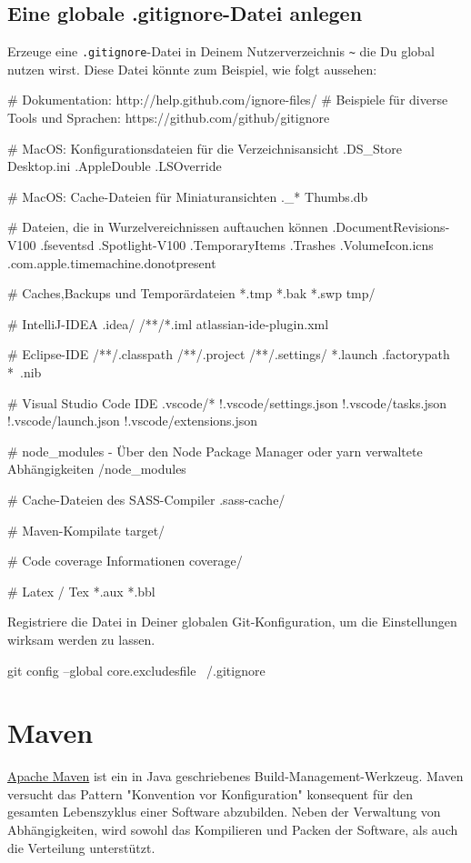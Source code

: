 \documentclass[]{article}
\newcommand{\code}[1]{\texttt{#1}}
\begin{document}
\subsection{Eine globale .gitignore-Datei anlegen}
Erzeuge eine \code{.gitignore}-Datei in Deinem Nutzerverzeichnis \code{\~} die Du global nutzen wirst. Diese Datei könnte zum Beispiel, wie folgt aussehen:
\begin{bashcode}
# Dokumentation: http://help.github.com/ignore-files/
# Beispiele für diverse Tools und Sprachen: https://github.com/github/gitignore

# MacOS: Konfigurationsdateien für die Verzeichnisansicht
.DS_Store
Desktop.ini
.AppleDouble
.LSOverride

# MacOS: Cache-Dateien für Miniaturansichten
._*
Thumbs.db

# Dateien, die in Wurzelvereichnissen auftauchen können
.DocumentRevisions-V100
.fseventsd
.Spotlight-V100
.TemporaryItems
.Trashes
.VolumeIcon.icns
.com.apple.timemachine.donotpresent

# Caches,Backups und Temporärdateien
*.tmp
*.bak
*.swp
tmp/

# IntelliJ-IDEA
.idea/
/**/*.iml
atlassian-ide-plugin.xml

# Eclipse-IDE
/**/.classpath
/**/.project
/**/.settings/
*.launch
.factorypath
*~.nib

 # Visual Studio Code IDE
.vscode/*
!.vscode/settings.json
!.vscode/tasks.json
!.vscode/launch.json
!.vscode/extensions.json

# node_modules - Über den Node Package Manager oder yarn verwaltete Abhängigkeiten
/node_modules

# Cache-Dateien des SASS-Compiler
.sass-cache/

# Maven-Kompilate
target/

# Code coverage Informationen
coverage/

 # Latex / Tex
*.aux
*.bbl

\end{bashcode}

Registriere die Datei in Deiner globalen Git-Konfiguration, um die Einstellungen wirksam werden zu lassen.
\begin{bashcode}
git config --global core.excludesfile ~/.gitignore
\end{bashcode}

\section{Maven}
\href{https://maven.apache.org/}{Apache Maven} ist ein in Java geschriebenes Build-Management-Werkzeug. Maven versucht das Pattern "Konvention vor Konfiguration" konsequent für den gesamten Lebenszyklus einer Software abzubilden. Neben der Verwaltung von Abhängigkeiten, wird sowohl das Kompilieren und Packen der Software, als auch die Verteilung unterstützt.
\end{document}
